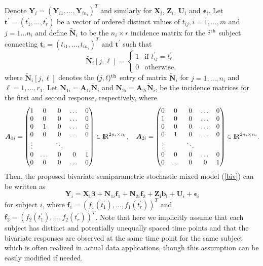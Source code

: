 \documentclass[review]{elsarticle}
\begin{document}
Denote $\bm Y_{i} = (\bm Y_{i1}, \dots, \bm Y_{in_i})^T$ and similarly for $\bm X_i$, $\bm Z_i$, $\bm U_i$ and $\bm \epsilon_i$. 
Let 
 $
\bm t^\prime = (t_{1}^\prime, \dots, t_r^\prime)
 $
be a vector of ordered distinct values of $t_{ij}, i = 1, \dots, m$ and $j = 1\dots n_i$ and
define
 $\bm {\tilde N}_i$ to be the $n_i \times r$ incidence matrix for the $i^{\rm th}$ subject connecting 
 $
 \bm t_i = (t_{i1}, \dots, t_{in_i})^T 
 $
 and
 $\bm t^\prime$ such that
 $$
\bm {\tilde N}_i [j, \ell] =
\begin{cases}
1 & \text{if } t_{ij}^\prime = t_\ell^\prime \\
0 & \text{otherwise},
\end{cases}
$$
where 
$\bm {\tilde N}_i [j, \ell]$ denotes the $(j, \ell)^{\rm th}$ entry of matrix $\bm {\tilde N}_i$ for $j = 1, \dots, n_i$ and $\ell = 1, \dots, r_1$. 
Let $\boldsymbol N_{1i} = \boldsymbol A_{1i} \boldsymbol {\tilde N} _i$  and $\boldsymbol N_{2i} = \boldsymbol A_{2i} \boldsymbol {\tilde N}_i$,  be the incidence matrices for the first and second response,
respectively, where 
\[
\boldsymbol A_{1i} =
 \begin{pmatrix}
   1 & 0 & 0 &  \dots & 0 \\
  0 & 0 & 0 &   \dots & 0 \\
  0 & 1 & 0 & \dots & 0 \\
   0 & 0 & 0 &   \dots & 0  \\
  \vdots &  & \ddots &  \\ 
 0 & \dots & 0  & 0 & 1\\
  0 & 0 & 0 &   \dots & 0 \\
 \end{pmatrix}
   \in {\rm I\!R}^{2n_i \times n_i},
\quad
\boldsymbol A_{2i} =
  \begin{pmatrix}
 0 & 0 & 0 &   \dots & 0 \\
1 & 0 & 0 &  \dots & 0 \\
 0 & 0 & 0 &   \dots & 0\\
0 & 1 & 0 & \dots & 0\\
  \vdots &  & \ddots &  \\ 
0 & 0 & 0 &   \dots & 0\\
0 & \dots & 0  & 0 & 1 \\
 \end{pmatrix}
  \in {\rm I\!R}^{2n_i \times n_i}.
 \]
Then, the proposed bivariate semiparametric stochastic mixed model  (\ref{biv}) can be written as
$$
\boldsymbol Y_{i} 
=
\boldsymbol{X_{i}}\boldsymbol{\beta} +
 \boldsymbol N_{1i} \boldsymbol f_1 + 
  \boldsymbol N_{2i} \boldsymbol f_2 + 
\boldsymbol{Z_{i}}\boldsymbol{b_{i}} + 
\boldsymbol U_{i} + 
\boldsymbol \epsilon_{i}
$$
for subject $i$, where 
$\bm f_1 = (f_1(t_1^\prime), \dots, f_1(t_r^\prime))^T$
and 
$\bm f_2 = (f_2(t_1^\prime), \dots, f_2(t_r^\prime))^T$.
Note that here we implicitly assume that each subject has distinct and potentially unequally spaced time points and that the bivariate responses are observed at the same time point for the same subject which is often realized in actual data applications, though this assumption can be easily modified if needed.
\end{document}
